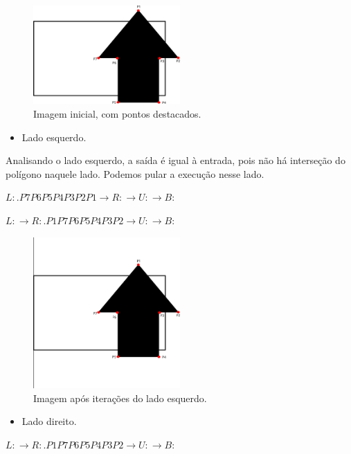 \documentclass[12pt]{article}
\begin{document}
\begin{figure}[H]
    \centering
    \includegraphics[width=0.5\textwidth]{images/5/5init.png}
    \caption*{Imagem inicial, com pontos destacados.}
\end{figure}{}

\begin{itemize}
    \item Lado esquerdo.
\end{itemize}{}
Analisando o lado esquerdo, a saída é igual à entrada, pois não há interseção do polígono naquele lado. Podemos pular a execução nesse lado.

$L: .P7P6P5P4P3P2P1 \xrightarrow{} R: \xrightarrow{} U: \xrightarrow{} B:$

$L: \xrightarrow{} R: .P1P7P6P5P4P3P2 \xrightarrow{} U: \xrightarrow{} B:$

\begin{figure}[H]
    \centering
    \includegraphics[width=0.5\textwidth]{images/5/5it1.png}
    \caption*{Imagem após iterações do lado esquerdo.}
\end{figure}{}

\begin{itemize}
    \item Lado direito.
\end{itemize}{}

$L: \xrightarrow{} R: .P1P7P6P5P4P3P2 \xrightarrow{} U: \xrightarrow{} B:$
\end{document}

